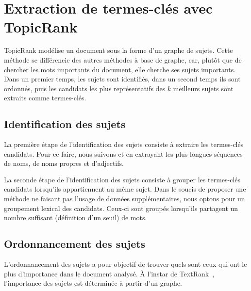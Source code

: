 \section{Extraction de termes-clés avec TopicRank}
\label{sec:extraction_de_termes_cles_avec_topicrank}
  TopicRank modélise un document sous la forme d'un graphe de sujets.
  Cette méthode se différencie des autres méthodes à base de graphe, car, plutôt
  que de chercher les mots importants du document, elle cherche ses sujets
  importants.
  Dans un premier temps, les sujets sont identifiés, dans un second temps ils
  sont ordonnés, puis les candidats les plus représentatifs des $k$ meilleurs
  sujets sont extraits comme termes-clés.

  \subsection{Identification des sujets}
  \label{subsec:identification_des_sujets}
    La première étape de l'identification des sujets consiste à extraire les
    termes-clés candidats.
    Pour ce faire, nous suivons  et
     en extrayant les plus longues séquences de
    noms, de noms propres et d'adjectifs.

    La seconde étape de l'identification des sujets consiste à grouper les
    termes-clés candidats lorsqu'ils appartiennent au même sujet.
    Dans le soucis de proposer une méthode ne faisant pas l'usage de données
    supplémentaires, nous optons pour un groupement lexical des candidats.
    Ceux-ci sont groupés lorsqu'ils partagent un nombre suffisant (définition
    d'un seuil) de mots.

  \subsection{Ordonnancement des sujets}
  \label{subsec:ordonnancement_des_sujets}
    L'ordonnancement des sujets a pour objectif de trouver quels sont ceux qui
    ont le plus d'importance dans le document analysé. À l'instar de
    TextRank~\cite{mihalcea2004textrank}, l'importance des sujets est déterminée
    à partir d'un graphe.

